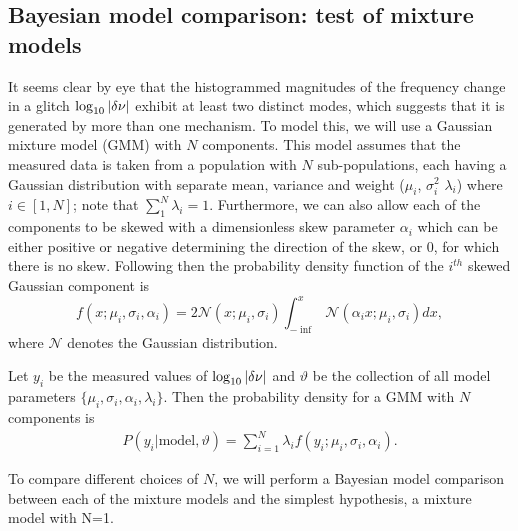 \documentclass[../full_thesis/full_thesis.tex]{subfiles}
\begin{document}
\begin{subappendices}
\section{Bayesian model comparison: test of mixture models}
\label{sec: Bayesian model comparison}

It seems clear by eye that the histogrammed magnitudes of the frequency change
in a glitch $\log_{10}|\delta\nu|$ exhibit at least two distinct modes,
which suggests that it is generated by more than one
mechanism. To model this, we will use a Gaussian mixture model (GMM)
\citep{gelman2013bayesian} with $N$ components. This model assumes that the
measured data is taken from a population with $N$ sub-populations, each having
a Gaussian distribution with separate mean, variance and weight
($\mu_{i}$, $\sigma^{2}_{i}$ $\lambda_{i}$) where $i \in [1, N]$; note that $\sum_{1}^{N} \lambda_{i} = 1$.
Furthermore, we can also allow each of the components to be
skewed with a dimensionless skew parameter $\alpha_i$ which can be either
positive or negative determining the direction of the skew, or 0, for which
there is no skew. Following \citet{Ohagan1976} then
the probability density function of the $i^{th}$ skewed Gaussian component is
\begin{equation}
f(x; \mu_i, \sigma_i, \alpha_i)
= 2 \mathcal{N}(x; \mu_i, \sigma_i)
\int_{-\inf}^{x} \mathcal{N}(\alpha_i x; \mu_i, \sigma_i) dx,
\end{equation}
where $\mathcal{N}$ denotes the Gaussian distribution.

Let $y_{i}$ be the measured values of $\log_{10}|\delta\nu|$
and $\vartheta$ be the collection of all model parameters
$\{\mu_i, \sigma_i, \alpha_i, \lambda_i\}$.
Then the probability density for a GMM with $N$ components is
\begin{align}
P(y_i| \textrm{model}, \vartheta) =
 \sum_{i=1}^{N} \lambda_i f (y_i; \mu_i, \sigma_i, \alpha_i).
\end{align}

To compare different choices of $N$, we will perform a Bayesian model comparison
\citep{jaynes2003probability} between each of the mixture models and the
simplest hypothesis, a mixture model with N=1.


\end{subappendices}
\end{document}
